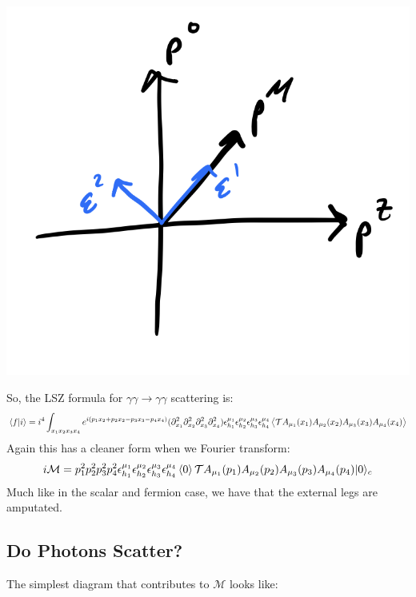\begin{center}
    \includegraphics[scale=0.35]{Lectures/Images/lec12-unphysicalpolarizations.png}
\end{center}


So, the LSZ formula for $\gamma\gamma \to \gamma\gamma$ scattering is:
\begin{equation}
    \langle f \lvert i \rangle = i^4\int_{x_1x_2x_3x_4}e^{i(p_1x_2 + p_2x_2 - p_3x_3 - p_4x_4)}(\partial_{x_1}^2\partial_{x_2}^2\partial_{x_3}^2\partial_{x_4}^2)\epsilon^{\mu_1}_{h_1}\epsilon^{\mu_2}_{h_2}\epsilon^{\mu_3}_{h_3}\epsilon^{\mu_4}_{h_4}\left< \mathcal{T}A_{\mu_1}(x_1)A_{\mu_2}(x_2)A_{\mu_3}(x_3)A_{\mu_4}(x_4) \right>
\end{equation}
Again this has a cleaner form when we Fourier transform:
\begin{equation}
    i\mathcal{M} = p_1^2p_2^2p_3^2p_4^2\epsilon^{\mu_1}_{h_1}\epsilon^{\mu_2}_{h_2}\epsilon^{\mu_3}_{h_3}\epsilon^{\mu_4}_{h_4}\left< 0 \right>\mathcal{T}A_{\mu_1}(p_1)A_{\mu_2}(p_2)A_{\mu_3}(p_3)A_{\mu_4}(p_4)\lvert 0 \rangle_c
\end{equation}
Much like in the scalar and fermion case, we have that the external legs are amputated.

\subsection{Do Photons Scatter?}
The simplest diagram that contributes to $\mathcal{M}$ looks like:

